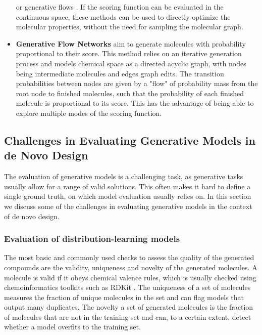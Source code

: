 \begin{itemize}
            or generative flows \citep{madhawaGraphNVPInvertibleFlow2019}. If the scoring function can
            be evaluated in the continuous space, these methods can be used to directly optimize the
            molecular properties, without the need for sampling the molecular graph.
      \item \textbf{Generative Flow Networks} \citep{bengioFlowNetworkBased2021} aim to generate
            molecules with probability proportional to their score. This method relies on an
            iterative generation process and models chemical space as a directed acyclic graph, with
            nodes being intermediate molecules and edges graph edits. The transition probabilities
            between nodes are given by a "flow" of probability mass from the root node to finished
            molecules, such that the probability of each finished molecule is proportional to its
            score. This has the advantage of being able to explore multiple modes of the scoring
            function.
\end{itemize}

\subsection{Challenges in Evaluating Generative Models in de Novo Design}
The evaluation of generative models is a challenging task, as generative tasks usually allow for a
range of valid solutions. This often makes it hard to define a single ground truth, on which model
evaluation usually relies on. In this section we discuss some of the challenges in evaluating
generative models in the context of de novo design.

\subsubsection{Evaluation of distribution-learning models}
The most basic and commonly used checks to assess the quality of the generated compounds are the
validity, uniqueness and novelty of the generated molecules. A molecule is valid if it obeys
chemical valence rules, which is usually checked using chemoinformatics toolkits such as RDKit
\citep{landrumRDKitOpensourceCheminformatics2006}. The uniqueness of a set of molecules measures the
fraction of unique molecules in the set and can flag models that output many duplicates. The novelty
a set of generated molecules is the fraction of molecules that are not in the training set and can,
to a certain extent, detect whether a model overfits to the training set.


